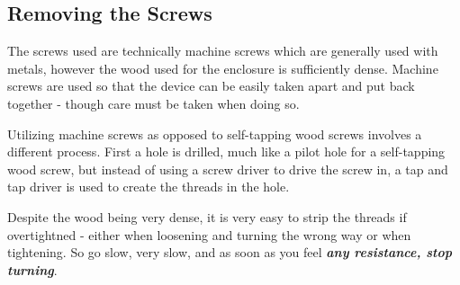 \subsection{Removing the Screws} \label{Removing the Screws}

The screws used are technically machine screws which are generally used with
metals, however the wood used for the enclosure is sufficiently dense. Machine
screws are used so that the device can be easily taken apart and put back
together - though care must be taken when doing so.

\par\medskip

Utilizing machine screws as opposed to self-tapping wood screws involves a
different process.  First a hole is drilled, much like a pilot hole for a
self-tapping wood screw, but instead of using a screw driver to drive the screw
in, a tap and tap driver is used to create the threads in the hole.

\par\medskip

Despite the wood being very dense, it is very easy to strip the threads if
overtightned - either when loosening and turning the wrong way or when
tightening.  So go slow, very slow, and as soon as you feel
\textit{\bfseries any resistance, stop turning}.

